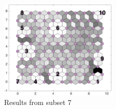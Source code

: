 \begin{figure}
        \centering
        \includegraphics[width=0.5\textwidth]{../../images0.01/M31/2D/image_subsets/subset7_dist_with_hits_t.png}
    \caption{Results from subset 7}
    \label{fig: subset7}
\end{figure}